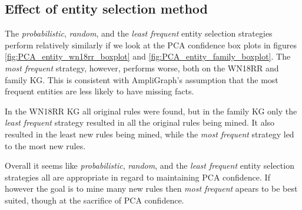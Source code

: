 \newpage
\subsection{Effect of entity selection method}
The \textit{probabilistic}, \textit{random}, and the \textit{least frequent} entity selection strategies perform relatively similarly if we look at the PCA confidence box plots in figures \ref{fig:PCA_entity_wn18rr_boxplot} and \ref{fig:PCA_entity_family_boxplot}. The \textit{most frequent} strategy, however, performs worse, both on the WN18RR and family KG. This is consistent with AmpliGraph's assumption that the most frequent entities are less likely to have missing facts.

In the WN18RR KG all original rules were found, but in the family KG only the \textit{least frequent} strategy resulted in all the original rules being mined. It also resulted in the least new rules being mined, while the \textit{most frequent} strategy led to the most new rules.

Overall it seems like \textit{probabilistic}, \textit{random}, and the \textit{least frequent} entity selection strategies all are appropriate in regard to maintaining PCA confidence. If however the goal is to mine many new rules then \textit{most frequent} apears to be best suited, though at the sacrifice of PCA confidence.

